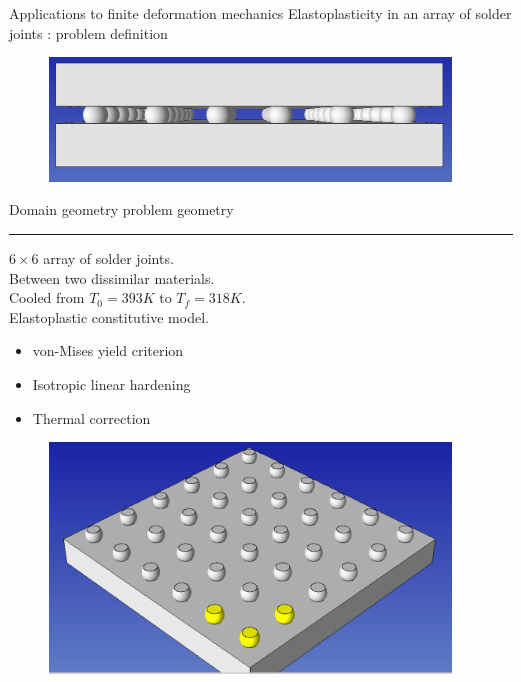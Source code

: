 \documentclass[fleqn]{beamer}
\begin{document}

\begin{frame}{Applications to finite deformation mechanics}
{Elastoplasticity in an array of solder joints : problem definition}
\scriptsize
\begin{minipage}{0.5\textwidth}
\begin{figure}
\centering
\includegraphics[width=0.95\textwidth]{../img/aut_solder_geom}
\end{figure}
Domain geometry problem geometry \\
\hrule
\vspace{1em}
$6 \times 6$ array of solder joints. \\
Between two dissimilar materials. \\
Cooled from $T_0 = 393K$ to $T_f = 318K$. \\ [8pt]
Elastoplastic constitutive model. \\
\vspace*{-1.25em}
\begin{itemize}
\item von-Mises yield criterion
\item Isotropic linear hardening
\item Thermal correction
\end{itemize}
\end{minipage}%
\begin{minipage}{0.5\textwidth}
\begin{figure}
\centering
\includegraphics[width=0.95\textwidth]{../img/aut_solder_qoi_geom}

\end{figure}
\end{minipage}
\end{frame}
\end{document}
